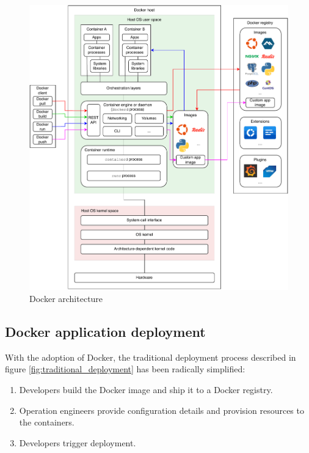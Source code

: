 \begin{figure}[htbp]
    \vspace{10pt}
    \centering
    \includegraphics[width=1\textwidth]{assets/docker_architecture.pdf}
    \caption{Docker architecture}
    \label{fig:docker_architecture}
    \vspace{10pt}
\end{figure}

\subsection{Docker application deployment}
With the adoption of Docker, the traditional deployment process described in figure \ref{fig:traditional_deployment} has been radically simplified:

\begin{enumerate}
    \item Developers build the Docker image and ship it to a Docker registry.
    \item Operation engineers provide configuration details and provision resources to the containers.
    \item Developers trigger deployment.
\end{enumerate}

